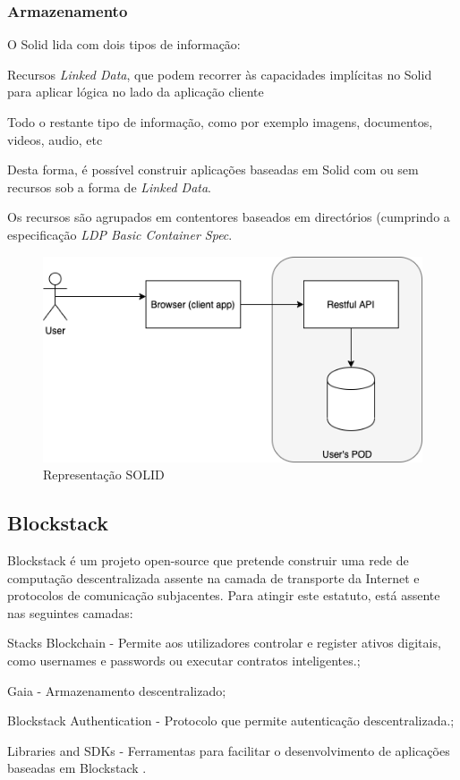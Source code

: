 \subsubsection{Armazenamento}
O Solid lida com dois tipos de informação:
\begin{description}
    \item Recursos \emph{Linked Data}, que podem recorrer às capacidades implícitas no Solid para aplicar lógica no lado da aplicação cliente
    \item Todo o restante tipo de informação, como por exemplo imagens, documentos, videos, audio, etc
\end{description}
Desta forma, é possível construir aplicações baseadas em Solid com ou sem recursos sob a forma de \emph{Linked Data}.\cite{solid_spec}

Os recursos são agrupados em contentores baseados em directórios (cumprindo a especificação \emph{LDP Basic Container Spec}.\cite{solid_spec}

\begin{figure}[H]
    \begin{center}
    \includegraphics[width=1\textwidth]{figures/estado_arte-Solid.png}
    \caption{Representação SOLID}
    \end{center}
\end{figure}


\subsection{Blockstack}
Blockstack é um projeto open-source que pretende construir uma rede de computação descentralizada assente na camada de transporte da Internet e protocolos de comunicação subjacentes. Para atingir este estatuto, está assente nas seguintes camadas:
\begin{description}
	\item Stacks Blockchain - Permite aos utilizadores controlar e register ativos digitais, como usernames e passwords ou executar contratos inteligentes.\cite{blockstack_white_paper};
	\item Gaia - Armazenamento descentralizado;
	\item Blockstack Authentication - Protocolo que permite autenticação descentralizada.\cite{blockstack_white_paper};
	\item Libraries and SDKs - Ferramentas para facilitar o desenvolvimento de aplicações baseadas em Blockstack \cite{blockstack_white_paper}.
\end{description}


